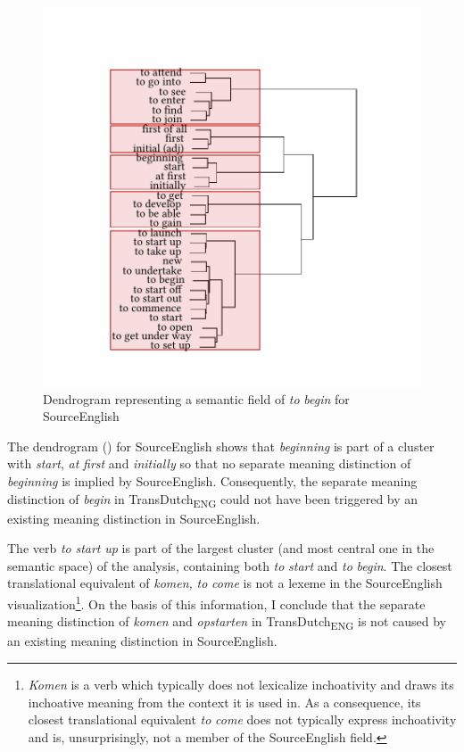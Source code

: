 \begin{figure}
\includegraphics[width=\textwidth]{figures/tree90.pdf}
\caption{\label{fig:4:87}  Dendrogram representing a semantic field of \textit{to} \textit{begin} for SourceEnglish}
\end{figure}

The dendrogram () for SourceEnglish shows that \textit{beginning} is part of a cluster with \textit{start}, \textit{at} \textit{first} and \textit{initially} so that no separate meaning distinction of \textit{beginning} is implied by SourceEnglish. Consequently, the separate meaning distinction of \textit{begin} in TransDutch\textsubscript{ENG} could not have been triggered by an existing meaning distinction in SourceEnglish.

The verb \textit{to} \textit{start} \textit{up} is part of the largest cluster (and most central one in the semantic space) of the analysis, containing both \textit{to} \textit{start} and \textit{to} \textit{begin}. The closest translational equivalent of \textit{komen,} \textit{to} \textit{come} is not a lexeme in the SourceEnglish visualization\footnote{\textit{Komen} is a verb which typically does not lexicalize inchoativity and draws its inchoative meaning from the context it is used in. As a consequence, its closest translational equivalent \textit{to} \textit{come} does not typically express inchoativity and is, unsurprisingly, not a member of the SourceEnglish field.}. On the basis of this information, I conclude that the separate meaning distinction of \textit{komen} and \textit{opstarten} in TransDutch\textsubscript{ENG} is not caused by an existing meaning distinction in SourceEnglish.


